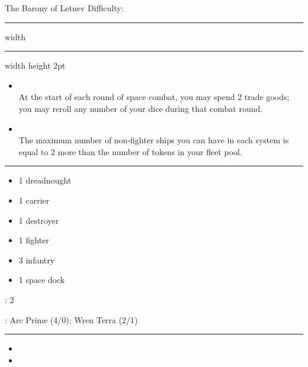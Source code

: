 {\handel \Huge The Barony of Letnev} \hfill {\Large Difficulty: \easy} \vspace{-4pt}\\
\hrule width \hsize \kern 1mm \hrule width \hsize height 2pt


\begin{multicols}{2}


\begin{itemize}
\item {}\\
At the start of each round of space combat, you may spend 2 trade goods; you may reroll any number of your dice during that combat round.
\item {}\\
The maximum number of non-fighter ships you can have in each system is equal to 2 more than the number of tokens in your fleet pool.
\end{itemize}


\vspace{-10pt}\rule{\hsize}{0.4pt}\vspace{5pt}


\vspace{-5pt}
\begin{multicols}{2}
\begin{itemize}
\item 1 dreadnought
\item 1 carrier
\item 1 destroyer
\item 1 fighter
\item 3 infantry
\item 1 space dock
\end{itemize}
\end{multicols}

\vspace{-5pt}
: 2

\vspace{2pt}
: Arc Prime (4/0); Wren Terra (2/1)

\rule{\hsize}{0.4pt}\vspace{5pt}


\begin{itemize}
\item \antimass
\item \plasma
\end{itemize}


\end{multicols}
